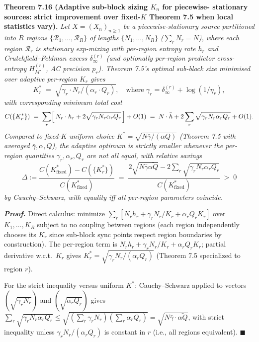\documentclass[
]{article}
\begin{document}
\textbf{Theorem 7.16 (Adaptive sub-block sizing $K_n$ for piecewise-
stationary sources: strict improvement over fixed-$K$ Theorem 7.5
when local statistics vary).}
\emph{Let $X = (X_n)_{n \geq 1}$ be a piecewise-stationary source
partitioned into $R$ regions $\{\mathcal{R}_1, \ldots, \mathcal{R}_R\}$
of lengths $\{N_1, \ldots, N_R\}$ ($\sum_r N_r = N$), where each
region $\mathcal{R}_r$ is stationary exp-mixing with per-region entropy
rate $h_r$ and Crutchfield--Feldman excess $\delta_\infty^{(r)}$ (and
optionally per-region predictor cross-entropy $H_{M'}^{(r)}$, AC
precision $p_r$). Theorem 7.5's optimal sub-block size minimised over
\emph{adaptive} per-region $K_r$ gives}
\[
K_r^* \;=\; \sqrt{\gamma_r \cdot N_r / (\alpha_r \cdot Q_r)},
\quad\text{where } \gamma_r = \delta_\infty^{(r)} + \log(1/\eta_r),
\]
\emph{with corresponding minimum total cost}
\[
C(\{K_r^*\}) \;=\; \sum_r \Bigl[\,N_r \cdot h_r + 2 \sqrt{\gamma_r N_r \alpha_r Q_r}\,\Bigr] + O(1)
\;=\;
N \cdot \bar{h} + 2 \sum_r \sqrt{\gamma_r N_r \alpha_r Q_r} + O(1).
\]
\emph{Compared to fixed-$K$ uniform choice $K^* = \sqrt{N \bar{\gamma}/(\alpha Q)}$
(Theorem 7.5 with averaged $\bar{\gamma}, \alpha, Q$), the adaptive
optimum is \emph{strictly smaller} whenever the per-region quantities
$\gamma_r, \alpha_r, Q_r$ are not all equal, with relative savings}
\[
\Delta := \frac{C(K^*_{\text{fixed}}) - C(\{K_r^*\})}{C(K^*_{\text{fixed}})}
\;=\;
\frac{2 \sqrt{N \bar{\gamma} \bar{\alpha Q}} - 2 \sum_r \sqrt{\gamma_r N_r \alpha_r Q_r}}{C(K^*_{\text{fixed}})}
\;>\; 0
\]
\emph{by Cauchy--Schwarz, with equality iff all per-region parameters
coincide.}

\emph{\textbf{Proof.}} Direct calculus: minimize
$\sum_r [N_r h_r + \gamma_r N_r / K_r + \alpha_r Q_r K_r]$ over
$K_1, \ldots, K_R$ subject to no coupling between regions (each region
independently chooses its $K_r$ since sub-block sync points respect
region boundaries by construction). The per-region term is
$N_r h_r + \gamma_r N_r/K_r + \alpha_r Q_r K_r$; partial derivative
w.r.t.\ $K_r$ gives $K_r^* = \sqrt{\gamma_r N_r / (\alpha_r Q_r)}$
(Theorem 7.5 specialized to region $r$).

For the strict inequality versus uniform $K^*$: Cauchy--Schwarz applied
to vectors $(\sqrt{\gamma_r N_r})$ and $(\sqrt{\alpha_r Q_r})$ gives
$\sum_r \sqrt{\gamma_r N_r \alpha_r Q_r} \leq \sqrt{(\sum_r \gamma_r N_r)
(\sum_r \alpha_r Q_r)} = \sqrt{N \bar{\gamma} \cdot \bar{\alpha Q}}$,
with strict inequality unless $\gamma_r N_r / (\alpha_r Q_r)$ is
constant in $r$ (i.e., all regions equivalent).
\hfill$\blacksquare$
\end{document}
